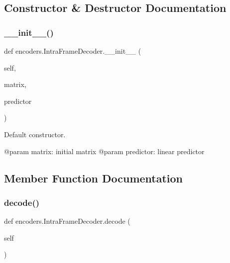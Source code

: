 \subsection{Constructor \& Destructor Documentation}
\mbox{\label{classencoders_1_1IntraFrameDecoder_a251ae11f0b35a2a53899d26595f3d6c4}} 
\subsubsection{\texorpdfstring{\+\_\+\+\_\+init\+\_\+\+\_\+()}{\_\_init\_\_()}}
{\footnotesize\ttfamily def encoders.\+Intra\+Frame\+Decoder.\+\_\+\+\_\+init\+\_\+\+\_\+ (\begin{DoxyParamCaption}\item[{}]{self,  }\item[{}]{matrix,  }\item[{}]{predictor }\end{DoxyParamCaption})}

\begin{DoxyVerb}Default constructor.

@param matrix: initial matrix
@param predictor: linear predictor
\end{DoxyVerb}
 

\subsection{Member Function Documentation}
\mbox{\label{classencoders_1_1IntraFrameDecoder_a44b94a3f3b4ff4fb8f4b983980f9b7ba}} 
\subsubsection{\texorpdfstring{decode()}{decode()}}
{\footnotesize\ttfamily def encoders.\+Intra\+Frame\+Decoder.\+decode (\begin{DoxyParamCaption}\item[{}]{self }\end{DoxyParamCaption})}

